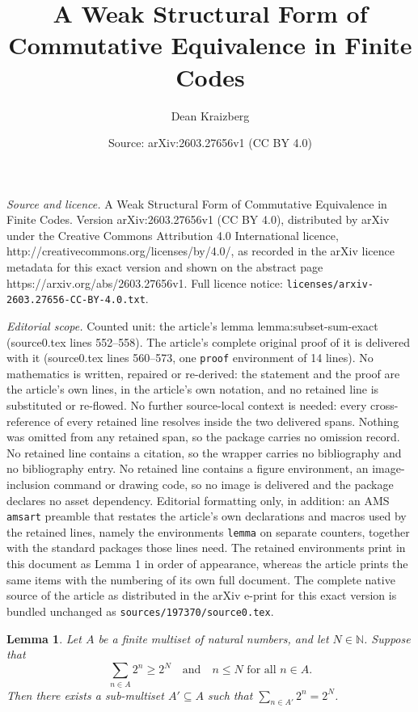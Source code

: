 \documentclass[10pt,a4paper]{amsart}
\title{A Weak Structural Form of Commutative Equivalence in Finite Codes}
\author{Dean Kraizberg}
\date{Source: arXiv:2603.27656v1 (CC BY 4.0)}
\newtheorem{lemma}{Lemma}
\begin{document}
\maketitle

\noindent\emph{Source and licence.} A Weak Structural Form of Commutative Equivalence in Finite Codes. Version arXiv:2603.27656v1 (CC BY 4.0), distributed by arXiv under the Creative Commons Attribution 4.0 International licence, http://creativecommons.org/licenses/by/4.0/, as recorded in the arXiv licence metadata for this exact version and shown on the abstract page https://arxiv.org/abs/2603.27656v1. Full licence notice: \texttt{licenses/arxiv-2603.27656-CC-BY-4.0.txt}.\par\smallskip

\noindent\textit{Editorial scope.} Counted unit: the article's lemma lemma:subset-sum-exact (source0.tex lines 552--558). The article's complete original proof of it is delivered with it (source0.tex lines 560--573, one \texttt{proof} environment of 14 lines). No mathematics is written, repaired or re-derived: the statement and the proof are the article's own lines, in the article's own notation, and no retained line is substituted or re-flowed.  No further source-local context is needed: every cross-reference of every retained line resolves inside the two delivered spans.  Nothing was omitted from any retained span, so the package carries no omission record.  No retained line contains a citation, so the wrapper carries no bibliography and no bibliography entry.  No retained line contains a figure environment, an image-inclusion command or drawing code, so no image is delivered and the package declares no asset dependency.  Editorial formatting only, in addition: an AMS \texttt{amsart} preamble that restates the article's own declarations and macros used by the retained lines, namely the environments \texttt{lemma} on separate counters, together with the standard packages those lines need.  The retained environments print in this document as Lemma 1 in order of appearance, whereas the article prints the same items with the numbering of its own full document.  The complete native source of the article as distributed in the arXiv e-print for this exact version is bundled unchanged as \texttt{sources/197370/source0.tex}.
\begin{lemma}\label{lemma:subset-sum-exact}
Let $A$ be a finite multiset of natural numbers, and let $N \in \mathbb{N}$. Suppose that 
\[
\sum_{n \in A} 2^n \ge 2^N \quad \text{and} \quad n \le N \text{ for all } n \in A.
\] 
Then there exists a sub-multiset $A' \subseteq A$ such that $\sum_{n \in A'} 2^n = 2^N$.
\end{lemma}
\end{document}
